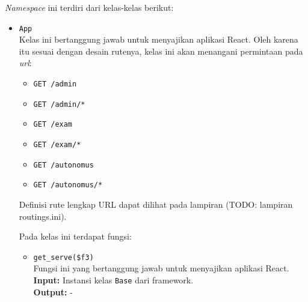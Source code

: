     \textit{Namespace} ini terdiri dari kelas-kelas berikut:
    \begin{itemize}
        \item \texttt{App} \\
            Kelas ini bertanggung jawab untuk menyajikan aplikasi React. Oleh
            karena itu sesuai dengan desain rutenya, kelas ini akan menangani
            permintaan pada \textit{url}:
            \begin{itemize}
                \item \texttt{GET /admin}
                \item \texttt{GET /admin/*}
                \item \texttt{GET /exam}
                \item \texttt{GET /exam/*}
                \item \texttt{GET /autonomus}
                \item \texttt{GET /autonomus/*}
            \end{itemize}
            Definisi rute lengkap URL dapat dilihat pada lampiran (TODO:
            lampiran routings.ini).
            
            Pada kelas ini terdapat fungsi:
            \begin{itemize}
                \item \texttt{get\_serve(\$f3)} \\
                    Fungsi ini yang bertanggung jawab untuk menyajikan aplikasi
                    React.\\
                    \textbf{Input:} Instansi kelas \texttt{Base} dari framework.
                    \\
                    \textbf{Output:} -
            \end{itemize}
        

\end{itemize}

